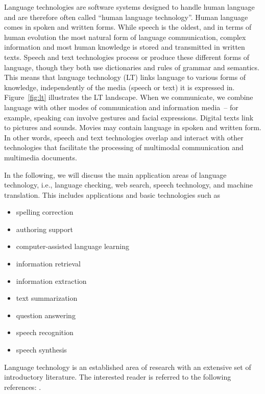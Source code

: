 \begin{multicols}{2}

Language technologies are software systems designed to handle human language and are therefore often called ``human language technology''.
Human language comes in spoken and written forms.
While speech is the oldest, and in terms of human evolution the most natural form of language communication, complex information and most human knowledge is stored and transmitted in written texts.
Speech and text technologies process or produce these different forms of language, though they both use dictionaries and rules of grammar and semantics.
This means that language technology (LT) links language to various forms of knowledge, independently of the media (speech or text) it is expressed in.
Figure~\ref{fig:lt} illustrates the LT landscape.
When we communicate, we combine language with other modes of communication and information media~-- for example, speaking can involve gestures and facial expressions.
Digital texts link to pictures and sounds.
Movies may contain language in spoken and written form.
In other words, speech and text technologies overlap and interact with other technologies that facilitate the processing of multimodal communication and multimedia documents.

In the following, we will discuss the main application areas of language technology, i.e., language checking, web search, speech technology, and machine translation.
This includes applications and basic technologies such as 
\begin{itemize}
\item  spelling correction
\item  authoring support
\item  computer-assisted language learning
\item  information retrieval 
\item  information extraction
\item  text summarization
\item  question answering
\item  speech recognition 
\item  speech synthesis 
\end{itemize}

Language technology is an established area of research with an extensive set of introductory literature. The interested reader is referred to the following references: \cite{carstensen-etal1, jurafsky-martin01, manning-schuetze1, lt-world1, lt-survey1}.


\end{multicols}
